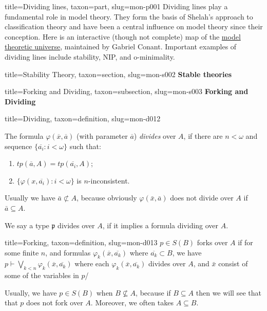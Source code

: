 \documentclass[a4paper]{article}
\begin{document}
  
  
\begin{tree}{title={Dividing lines}, taxon={part}, slug={mon-p001}}
Dividing lines play a fundamental role in model theory. They form the basis of Shelah's approach to classification theory and have been a central influence on model theory since their conception. Here is an interactive (though not complete) map of the \href{https://forkinganddividing.com}{model theoretic universe}, maintained by Gabriel Conant. Important examples of dividing lines include stability, NIP, and o-minimality.
  
  
\begin{tree}{title={Stability Theory}, taxon={section}, slug={mon-s002}}
\textbf{Stable theories}
\begin{tree}{title={Forking and Dividing}, taxon={subsection}, slug={mon-s003}}
\textbf{Forking and Dividing}
\begin{tree}{title={Dividing}, taxon={definition}, slug={mon-d012}}

The formula \(\varphi ( \overline {x}, \overline {a})\) (with parameter \(\overline {a}\)) \emph{divides} over \(A\), if there are \(n< \omega\) and sequence \(\{ \overline {a_i}:i< \omega \}\) such that:
\begin{enumerate}
\item{\(tp( \overline {a},A)=tp( \overline {a_i},A)\);}
    \item{\(\{ \varphi (x, \overline {a_i}):i< \omega \}\) is \(n\)-inconsistent.}
\end{enumerate}
Usually we have \(\bar {a} \not \subset  A\), because obviously \(\varphi ( \bar {x}, \bar {a})\) does not divide over \(A\) if \(\bar {a} \subseteq  A\).

We say a type \(\mathfrak {p}\) divides over \(A\), if it implies a formula dividing over \(A\).

\end{tree}

\begin{tree}{title={Forking}, taxon={definition}, slug={mon-d013}}
 \(p \in  S(B)\) forks over \(A\) if for some finite \(n\), and formulas \(\varphi _k( \overline {x}, \overline {a_{k}})\) where \(\overline {a_k} \subset  B\), we have \(p \vdash \bigvee _{k<n} \varphi _k( \overline {x}, \overline {a_{k}})\) where each \(\varphi _k( \overline {x}, \overline {a_{k}})\) divides over \(A\), and \(\bar {x}\) consist of some of the variables in \(p\)/

Usually, we have \(p \in  S(B)\) when \(B \not \subseteq  A\), because if \(B \subseteq  A\) then we will see that that \(p\) does not fork over \(A\). Moreover, we often takes \(A \subseteq  B\).


\end{tree}
\end{tree}
\end{tree}
\end{tree}
\end{document}
